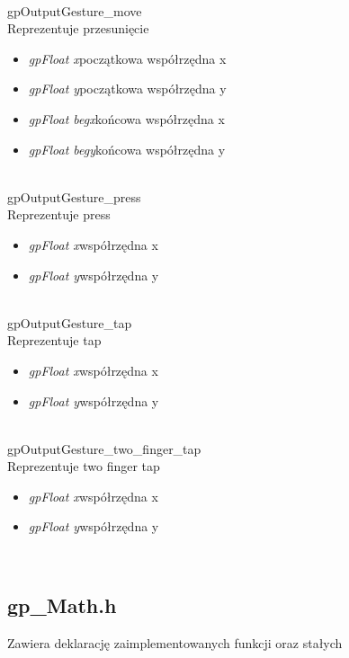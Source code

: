 \ \\
\textsf{gpOutputGesture_move} \\ \indent Reprezentuje przesunięcie
	\begin{itemize}
		\item \textit{gpFloat x}\quad początkowa współrzędna x
		\item \textit{gpFloat y}\quad początkowa współrzędna y
		\item \textit{gpFloat begx}\quad końcowa współrzędna x
		\item \textit{gpFloat begy}\quad końcowa współrzędna y
	\end{itemize}
\ \\
\textsf{gpOutputGesture_press} \\ \indent Reprezentuje press
	\begin{itemize}
		\item \textit{gpFloat x}\quad współrzędna x
		\item \textit{gpFloat y}\quad współrzędna y
	\end{itemize}
\ \\
\textsf{gpOutputGesture_tap} \\ \indent Reprezentuje tap
	\begin{itemize}
		\item \textit{gpFloat x}\quad współrzędna x
		\item \textit{gpFloat y}\quad współrzędna y
	\end{itemize}
\ \\
\textsf{gpOutputGesture_two_finger_tap} \\ \indent Reprezentuje two finger tap
	\begin{itemize}
		\item \textit{gpFloat x}\quad współrzędna x
		\item \textit{gpFloat y}\quad współrzędna y
	\end{itemize}
\ \\

\subsection{gp_Math.h}
Zawiera deklarację zaimplementowanych funkcji oraz stałych
